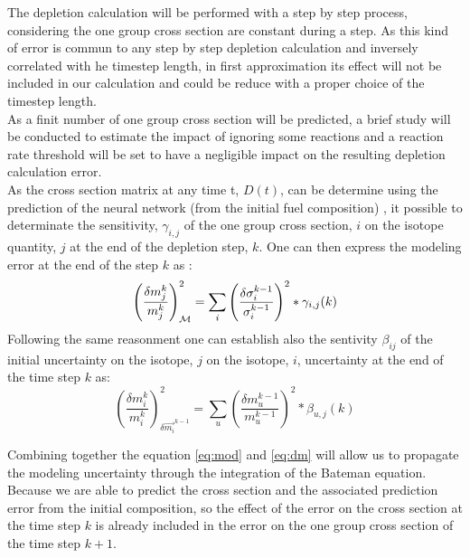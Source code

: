 \documentclass[dvips,12pt]{article}
\begin{document}
The depletion calculation will be performed with a
step by step process, considering the one group
cross section are constant during a step. As this
kind of error is commun to any step by step
depletion calculation and inversely correlated
with he timestep length, in first approximation
its effect will not be included in our calculation
and could be reduce with a proper choice of the
timestep length. \\
As a finit number of one group cross section will
be predicted, a brief study will be conducted to
estimate the impact of ignoring some reactions and
a reaction rate threshold will be set to have a
negligible impact on the resulting depletion
calculation error.\\

As the cross section matrix at any time t, $D(t)$,
can be determine using the prediction of the
neural network (from the initial fuel composition)
, it possible to determinate the sensitivity,
$\gamma_{i,j}$  of the one group cross section,
$i$ on the isotope quantity, $j$ at the end of the
depletion step, $k$. One can then express the
modeling error at the end of the step $k$ as :
\begin{equation}
  \left( \frac{\delta m_j^{k}}{m_j^{k}} \right)^{2} _{{\cal M}} = \sum_{i}\left( \frac{\delta \sigma_i^{k-1}}{\sigma_i^{k-1}} \right)^{2} *\gamma_{i,j}(k)\label{eq:mod}
\end{equation}
Following the same reasonment one can establish
also the sentivity $\beta_{ij}$ of the initial
uncertainty on the isotope, $j$ on the isotope,
$i$, uncertainty at the end of the time step $k$
as:
\begin{equation}
  \left( \frac{\delta m_i^{k}}{m_i^{k}} \right)^{2} _{\delta \vec{m_i}^{k-1} } = \sum_{u}\left( \frac{\delta m_u^{k-1}}{m_u^{k-1}} \right)^{2} *\beta_{u,j}(k) \label{eq:dm}
\end{equation}



Combining together the equation \eqref{eq:mod} and
\eqref{eq:dm} will allow us to propagate the
modeling uncertainty through the integration of
the Bateman equation. Because we are able to
predict the cross section and the associated
prediction error from the initial composition, so
the effect of the error on the cross section at
the time step $k$ is already included in the error
on the one group cross section of the time step
$k+1$.
\end{document}
